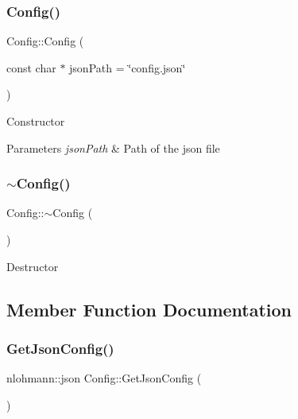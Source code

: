 \subsubsection{\texorpdfstring{Config()}{Config()}}
{\footnotesize\ttfamily Config\+::\+Config (\begin{DoxyParamCaption}\item[{const char $\ast$}]{json\+Path = {\ttfamily \char`\"{}config.json\char`\"{}} }\end{DoxyParamCaption})}



Constructor 


\begin{DoxyParams}{Parameters}
{\em json\+Path} & Path of the json file\\
\hline
\end{DoxyParams}
\mbox{\label{class_config_a543dce59b66475c5108088ee4ce1cdfc}} 
\subsubsection{\texorpdfstring{$\sim$\+Config()}{~Config()}}
{\footnotesize\ttfamily Config\+::$\sim$\+Config (\begin{DoxyParamCaption}{ }\end{DoxyParamCaption})}



Destructor 



\subsection{Member Function Documentation}
\mbox{\label{class_config_aaa1d09459a8874cafe046f069c5eb2bf}} 
\subsubsection{\texorpdfstring{Get\+Json\+Config()}{GetJsonConfig()}}
{\footnotesize\ttfamily nlohmann\+::json Config\+::\+Get\+Json\+Config (\begin{DoxyParamCaption}{ }\end{DoxyParamCaption})}



